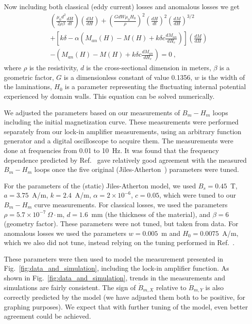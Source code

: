 Now including both classical (eddy current) losses and anomalous
losses we get
\begin{equation}
  \begin{aligned}
    &\left (  \frac{\mu_0d^2}{2 \rho \beta} \frac{dH}{dt} \right)\left( \frac{dM}{dH} \right)+ \left (\frac{GdW\mu_0 H_0}{\rho} \right)^2 \left( \frac{dH}{dt} \right)^2 \left( \frac{dM}{dH} \right)^{3/2} \\
    &+ \left[k\delta - \alpha \left( M_{an}(H) - M(H) + k \delta c \frac{dM_{an}}{dH_e}\right)\right] \left( \frac{dM}{dH} \right) \\
    &- \left(M_{an}(H) - M(H) + k \delta c\frac{dM_{an}}{dH_e} \right) = 0~,
  \end{aligned}
\end{equation}
where $\rho$ is the resistivity, $d$ is the cross-sectional dimension
in meters, $\beta$ is a geometric factor, $G$ is a dimensionless
constant of value 0.1356, $w$ is the width of the laminations, $H_0$
is a parameter representing the fluctuating internal potential
experienced by domain walls. This equation can be solved numerically.


We adjusted the parameters based on our
measurements of $B_m-H_m$ loops including the initial magnetization
curve.  These measurements were performed separately from our lock-in
amplifier measurements, using an arbitrary function generator and a
digital oscilloscope to acquire them.  The measurements were done at
frequencies from 0.01 to 10~Hz.  It was found that the frequency
dependence predicted by Ref.~\cite{jiles1994frequency} gave relatively good
agreement with the measured $B_m-H_m$ loops once the five original
(Jiles-Atherton~\cite{jiles1984theory,jiles1986theory}) parameters were tuned.

For the parameters of the (static) Jiles-Atherton model, we used
$B_s=0.45$~T, $a=3.75$~A/m, $k=2.4$~A/m, $\alpha=2\times 10^{-6}$,
$c=0.05$, which were tuned to our $B_m-H_m$ curve measurements.  For
classical losses, we used the parameters $\rho=5.7\times
10^{-7}~\Omega\cdot$m, $d=1.6$~mm (the thickness of the material), and
$\beta=6$ (geometry factor).  These parameters were not tuned, but
taken from data.  For anomalous losses we used the parameters
$w=0.005$~m and $H_0=0.0075$~A/m, which we also did not tune, instead
relying on the tuning performed in Ref.~\cite{jiles1994frequency}.

These parameters were then used to model the measurement presented in
Fig.~\ref{fig:data_and_simulation}, including the lock-in amplifier
function.  As shown in Fig.~\ref{fig:data_and_simulation}, trends in
the measurements and simulations are fairly consistent.  The sign of
$\dot{B}_{m,X}$ relative to $\dot{B}_{m,Y}$ is also correctly
predicted by the model (we have adjusted them both to be positive, for
graphing purposes).  We expect that with further tuning of the model,
even better agreement could be achieved.

